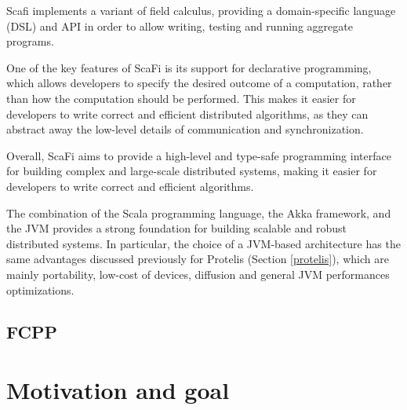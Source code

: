 Scafi implements a variant of field calculus, providing a domain-specific language (DSL) and API in order to allow writing, testing and running aggregate programs.

One of the key features of ScaFi is its support for declarative programming, which allows developers to specify the desired outcome of a computation, rather than how the computation should be performed. This makes it easier for developers to write correct and efficient distributed algorithms, as they can abstract away the low-level details of communication and synchronization.

Overall, ScaFi aims to provide a high-level and type-safe programming interface for building complex and large-scale distributed systems, making it easier for developers to write correct and efficient algorithms. 

The combination of the Scala programming language, the Akka framework, and the JVM provides a strong foundation for building scalable and robust distributed systems.\newline
In particular, the choice of a JVM-based architecture has the same advantages discussed previously for Protelis (Section \ref{protelis}), which are mainly portability, low-cost of devices, diffusion and general JVM performances optimizations.

\subsection{FCPP}

\section{Motivation and goal}